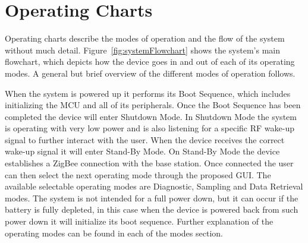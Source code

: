 \section{Operating Charts}
Operating charts describe the modes of operation and the flow of the system without much detail. Figure~\ref{fig:systemFlowchart} shows the system's main flowchart, which depicts how the device goes in and out of each of its operating modes.  A general but brief overview of the different modes of operation follows.

When the system is powered up it performs its Boot Sequence, which includes initializing the MCU and all of its peripherals. Once the Boot Sequence has been completed the device will enter Shutdown Mode. In Shutdown Mode the system is operating with very low power and is also listening for a specific RF wake-up signal to further interact with the user. When the device receives the correct wake-up signal it will enter Stand-By Mode. On Stand-By Mode the device establishes a ZigBee connection with the base station. Once connected the user can then select the next operating mode through the proposed GUI. The available selectable operating modes are Diagnostic, Sampling and Data Retrieval modes. The system is not intended for a full power down, but it can occur if the battery is fully depleted, in this case when the device is powered back from such power down it will initialize its boot sequence. Further explanation of the operating modes can be found in each of the modes section.

